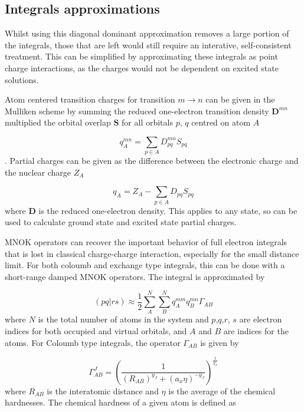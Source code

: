 \subsection{Integrals approximations}
\label{subsec:MNOK}

Whilst using this diagonal dominant approximation removes a large portion of the
integrals, those that are left would still require an interative, self-consistent
treatment. This can be simplified by approximating these integrals as point charge 
interactions, as the charges would not be dependent on excited state solutions.

Atom centered transition charges for transition $m \rightarrow n$ can be given in
the Mulliken scheme by summing the reduced one-electron transition density 
$\mathbf{D}^{mn}$ multiplied the orbital overlap $\mathbf{S}$ for all orbitals $p$, 
$q$ centred on atom $A$

\begin{equation}
q^{mn}_A = \sum_{p \in A} D^{mn}_{pq} S_{pq}  
\end{equation}
%
. Partial charges can be given as the difference between the electronic charge
and the nuclear charge $Z_A$

\begin{equation}
q_A = Z_A - \sum_{p \in A} D_{pq} S_{pq}  
\end{equation}
%
where $\mathbf{D}$ is the reduced one-electron density. This applies to any state,
so can be used to calculate ground state and excited state partial charges.

MNOK operators can recover the important behavior of full electron integrals that
is lost in classical charge-charge interaction, especially for the small distance limit.
For both coloumb and exchange type integrals, this can be done with a short-range
damped MNOK operators. The integral is approximated by

\begin{equation}
\left(pq|rs\right) \approx \frac{1}{2}\sum^N_A \sum^N_B q_A^{mm} q_B^{mn} \Gamma_{AB}
\end{equation}
%
where $N$ is the total number of atoms in the system and $p$,$q$,$r$, $s$ are electron
indices for both occupied and virtual orbitals, and $A$ and $B$ are indices for
 the atoms. For Coloumb type integrals, the operator $\Gamma_{AB}$ is given by

\begin{equation}
\Gamma^J_{AB} = \left(\frac{1}{\left(R_{AB}\right)^{y_J} + \left(a_x \eta\right)^{-y_J}} \right)^{\frac{1}{y_J}}
\end{equation}
%
where $R_{AB}$ is the interatomic distance and $\eta$ is the average of the chemical 
hardnesses. The chemical hardness of a given atom is defined as

